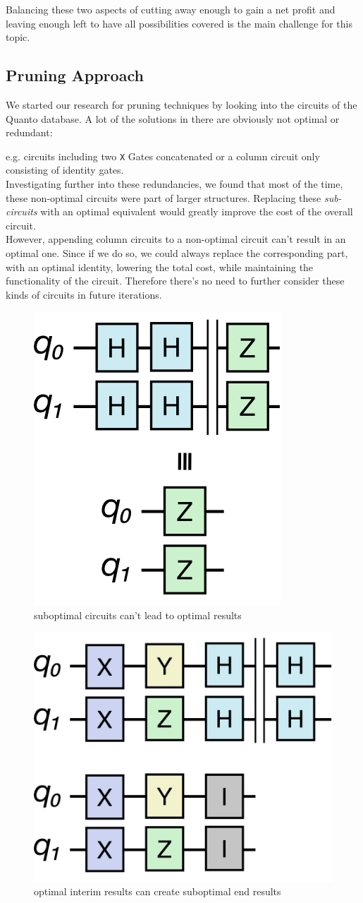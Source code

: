 Balancing these two aspects of cutting away enough to gain a net profit and leaving enough left to have all possibilities covered is the main challenge for this topic.

\subsection{Pruning Approach}
We started our research for pruning techniques by looking into the circuits of the Quanto database. A lot of the solutions in there are obviously not optimal or redundant: 

e.g. circuits including two \texttt{X} Gates concatenated or a column circuit only consisting of identity gates. \\

Investigating further into these redundancies, we found that most of the time, these non-optimal circuits were part of larger structures. Replacing these \textit{sub-circuits} with an optimal equivalent would greatly improve the cost of the overall circuit. \\

However, appending column circuits to a non-optimal circuit can't result in an optimal one. Since if we do so, we could always replace the corresponding part, with an optimal identity, lowering the total cost, while maintaining the functionality of the circuit. Therefore there's no need to further consider these kinds of circuits in future iterations.\\

\begin{figure}
	\includegraphics[width=0.4\columnwidth]{assets/approach.png}
	\caption{suboptimal circuits can't lead to optimal results}
	\label{fig:approach}
\end{figure}

\begin{figure}
	\includegraphics[width=0.4\columnwidth]{assets/approach-2.png}
	\caption{optimal interim results can create suboptimal end results}
	\label{fig:approach}
\end{figure}

